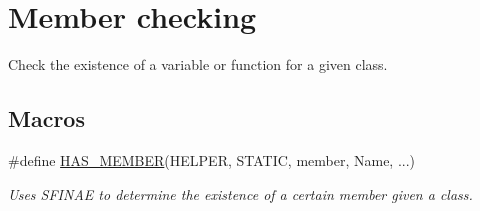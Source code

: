 \hypertarget{group__HasMemberGroup}{}\section{Member checking}
\label{group__HasMemberGroup}


Check the existence of a variable or function for a given class.  


\subsection*{Macros}
\begin{DoxyCompactItemize}
\item 
\#define \hyperlink{group__HasMemberGroup_ga37993e5e75a0249077679e4776e89085}{H\+A\+S\+\_\+\+M\+E\+M\+B\+ER}(H\+E\+L\+P\+ER,  S\+T\+A\+T\+IC,  member,  Name, ...)
\begin{DoxyCompactList}\small\item\em Uses S\+F\+I\+N\+AE to determine the existence of a certain member given a class. \end{DoxyCompactList}\end{DoxyCompactItemize}
\label{_amgrp01747264fe7bf50731df0522c351974e}%
